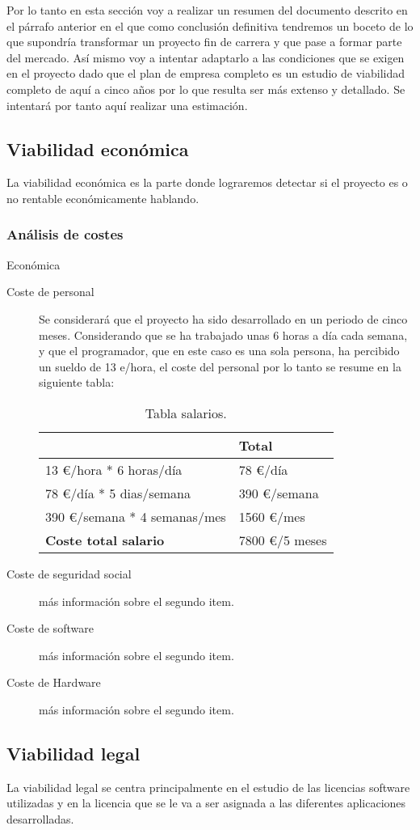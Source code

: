 Por lo tanto en esta sección voy a realizar un resumen del documento descrito en el párrafo anterior en el que como conclusión definitiva tendremos un boceto de lo que supondría transformar un proyecto fin de carrera y que pase a formar parte del mercado. Así mismo voy a intentar adaptarlo a las condiciones que se exigen en el proyecto dado que el plan de empresa completo es un estudio de viabilidad completo de aquí a cinco años por lo que resulta ser más extenso y detallado. Se intentará por tanto aquí realizar una estimación.

\subsection{Viabilidad económica}\label{viabilidad-economica}

La viabilidad económica es la parte donde lograremos detectar si el proyecto es o no rentable económicamente hablando.

\subsubsection{Análisis de costes}\label{costes}
Económica
\begin{description}
	\item[Coste de personal] Se considerará que el proyecto ha sido desarrollado en un periodo de cinco meses.  Considerando que se ha trabajado unas 6 horas a día cada semana, y que el programador, que en este caso es una sola persona, ha percibido un sueldo de 13 e/hora, el coste del personal por lo tanto se resume en la siguiente tabla:
	
\begin{table}[htbp]
\begin{center}
\begin{tabular}{|l|l|}
\hline
 & Total \\
\hline \hline
13 \euro /hora * 6 horas/día &   78 \euro /día \\ \hline
78 \euro /día * 5 dias/semana &   390 \euro /semana \\ \hline
390 \euro /semana * 4 semanas/mes &   1560 \euro /mes \\ \hline
\textbf{Coste total salario} &   7800 \euro /5 meses \\ \hline
\end{tabular}
\caption{Tabla salarios.}
\label{tabla:salarios}
\end{center}
\end{table}
	
	\item[Coste de seguridad social] más información sobre el segundo item.
	
	\item[Coste de software] más información sobre el segundo item.
	
	\item[Coste de Hardware] más información sobre el segundo item.

\end{description}

\subsection{Viabilidad legal}\label{viabilidad-legal}
La viabilidad legal se centra principalmente en el estudio de las licencias software utilizadas y en la licencia que se le va a ser asignada a las diferentes aplicaciones desarrolladas.




